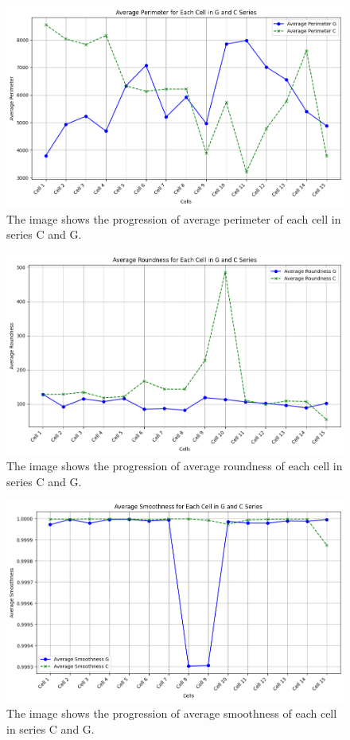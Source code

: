 \documentclass{article}
\begin{document}
\begin{figure}[h!]
\centering
\includegraphics[width=0.75\linewidth]{Report/RImages/Graphs/average_perimeter_1.png}
\caption{\label{fig:Mean_Distance}The image shows the progression of average perimeter of each cell in series C and G.}
\end{figure}

\begin{figure}[h!]
\centering
\includegraphics[width=0.75\linewidth]{Report/RImages/Graphs/average_roundness_1.png}
\caption{\label{fig:Mean_Distance}The image shows the progression of average roundness of each cell in series C and G.}
\end{figure}

\begin{figure}[h!]
\centering
\includegraphics[width=0.75\linewidth]{Report/RImages/Graphs/average_smoothness_1.png}
\caption{\label{fig:Mean_Distance}The image shows the progression of average smoothness of each cell in series C and G.}
\end{figure}
\end{document}
